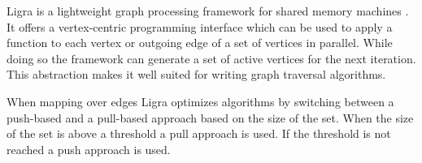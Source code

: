 
Ligra is a lightweight graph processing framework for shared memory machines \cite{Ligra}. It offers a vertex-centric programming interface which can be used to apply a function to each vertex or outgoing edge of a set of vertices in parallel. While doing so the framework can generate a set of active vertices for the next iteration. This abstraction makes it well suited for writing graph traversal algorithms.

When mapping over edges Ligra optimizes algorithms by switching between a push-based and a pull-based approach based on the size of the set. When the size of the set is above a threshold a pull approach is used. If the threshold is not reached a push approach is used.
